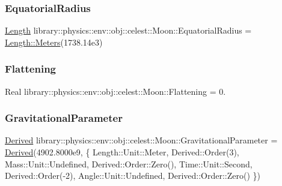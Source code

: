 \subsubsection{\texorpdfstring{Equatorial\+Radius}{EquatorialRadius}}
{\footnotesize\ttfamily \hyperlink{classlibrary_1_1physics_1_1units_1_1_length}{Length} library\+::physics\+::env\+::obj\+::celest\+::\+Moon\+::\+Equatorial\+Radius = \hyperlink{classlibrary_1_1physics_1_1units_1_1_length_ad523a3737d5c3f23a64588eac83f2148}{Length\+::\+Meters}(1738.\+14e3)\hspace{0.3cm}{\ttfamily [static]}}

\mbox{\label{classlibrary_1_1physics_1_1env_1_1obj_1_1celest_1_1_moon_a02e660fcf1bf06697a037a354f698499}} 
\subsubsection{\texorpdfstring{Flattening}{Flattening}}
{\footnotesize\ttfamily Real library\+::physics\+::env\+::obj\+::celest\+::\+Moon\+::\+Flattening = 0.\hspace{0.3cm}{\ttfamily [static]}}

\mbox{\label{classlibrary_1_1physics_1_1env_1_1obj_1_1celest_1_1_moon_a3ef853ee9345bbad3e58d7f0a9d14030}} 
\subsubsection{\texorpdfstring{Gravitational\+Parameter}{GravitationalParameter}}
{\footnotesize\ttfamily \hyperlink{classlibrary_1_1physics_1_1units_1_1_derived}{Derived} library\+::physics\+::env\+::obj\+::celest\+::\+Moon\+::\+Gravitational\+Parameter = \hyperlink{classlibrary_1_1physics_1_1units_1_1_derived}{Derived}(4902.\+8000e9, \{ Length\+::\+Unit\+::\+Meter, Derived\+::\+Order(3), Mass\+::\+Unit\+::\+Undefined, Derived\+::\+Order\+::\+Zero(), Time\+::\+Unit\+::\+Second, Derived\+::\+Order(-\/2), Angle\+::\+Unit\+::\+Undefined, Derived\+::\+Order\+::\+Zero() \})\hspace{0.3cm}{\ttfamily [static]}}



